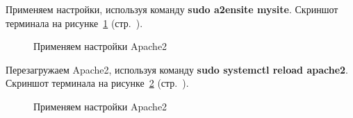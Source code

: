 Применяем настройки, используя команду \textbf{sudo a2ensite mysite}.
Скриншот терминала на рисунке~\ref{fig:sudo-a2ensite} (стр.~\pageref{fig:sudo-a2ensite}).

\begin{figure}[p]
    \caption{Применяем настройки Apache2}
    \label{fig:sudo-a2ensite}
\end{figure}

Перезагружаем Apache2, используя команду \textbf{sudo systemctl reload apache2}.
Скриншот терминала на рисунке~\ref{fig:sudo-system-ctl-reload-apache2} (стр.~\pageref{fig:sudo-system-ctl-reload-apache2}).

\begin{figure}[p]
    \caption{Применяем настройки Apache2}
    \label{fig:sudo-system-ctl-reload-apache2}
\end{figure}

